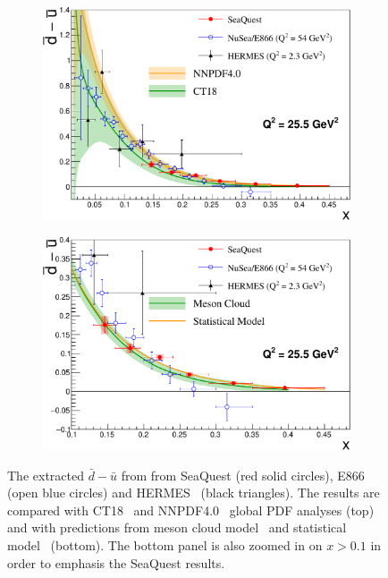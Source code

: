 \documentclass[reprint,aps,unsortedaddress,superscriptaddress,prl,floatfix,showpacs,linenumbers,final]{revtex4-2}
\begin{document}
\begin{figure}[htpb!]
	\centering
	\begin{subfigure}{\linewidth}
		\includegraphics[width=\linewidth]{dbub_diff_with_PDF.pdf}
	\end{subfigure}
	\begin{subfigure}{\linewidth}
		\includegraphics[width=\linewidth]{dbub_diff_with_model.pdf}
	\end{subfigure}
	\caption{The extracted $\bar{d}-\bar{u}$ from from SeaQuest (red solid circles), E866~\cite{towell2001} (open blue circles)
		and HERMES~\cite{ackerstaff1998} (black triangles).
		The results are compared with CT18~\cite{hou2021} and NNPDF4.0~\cite{ball2022a} global PDF analyses (top)
		and with predictions from meson cloud model~\cite{alberg2022} and statistical model~\cite{soffer2019} (bottom).
		The bottom panel is also zoomed in on $x>0.1$ in order to emphasis the SeaQuest results.}
	\label{fig:e906_e866_dbarMubar}
\end{figure}
\end{document}
